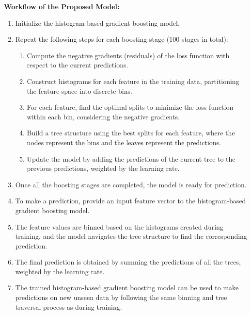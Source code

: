 \textbf{Workflow of the Proposed Model:}
\begin{enumerate}
    \item Initialize the histogram-based gradient boosting model.
    \item Repeat the following steps for each boosting stage (100 stages in total):
    \begin{enumerate}
        \item Compute the negative gradients (residuals) of the loss function with respect to the current predictions.
        \item Construct histograms for each feature in the training data, partitioning the feature space into discrete bins.
        \item For each feature, find the optimal splits to minimize the loss function within each bin, considering the negative gradients.
        \item Build a tree structure using the best splits for each feature, where the nodes represent the bins and the leaves represent the predictions.
        \item Update the model by adding the predictions of the current tree to the previous predictions, weighted by the learning rate.
    \end{enumerate}
    \item Once all the boosting stages are completed, the model is ready for prediction.
    \item To make a prediction, provide an input feature vector to the histogram-based gradient boosting model.
    \item The feature values are binned based on the histograms created during training, and the model navigates the tree structure to find the corresponding prediction.
    \item The final prediction is obtained by summing the predictions of all the trees, weighted by the learning rate.
    \item The trained histogram-based gradient boosting model can be used to make predictions on new unseen data by following the same binning and tree traversal process as during training.
\end{enumerate}

